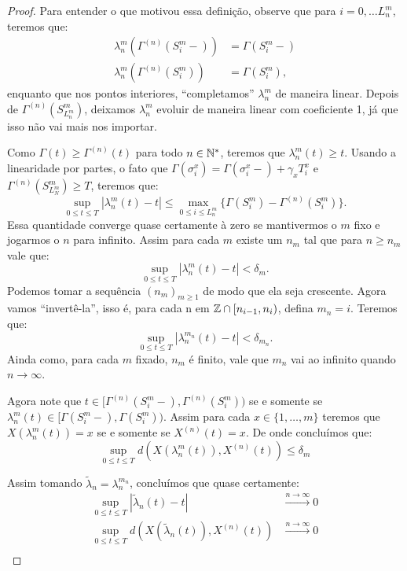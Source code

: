 \begin{proof}
  Para entender o que motivou essa definição, observe que para $i = 0,
  \ldots L_n^m$, teremos que:
  \begin{align*}
    \lambda_n^m(\Gamma^{(n)}(S_i^m-)) &= \Gamma(S_i^m-)\\
    \lambda_n^m(\Gamma^{(n)}(S_i^m)) &= \Gamma(S_i^m),
  \end{align*}
  enquanto que nos pontos interiores, ``completamos'' $\lambda_n^m$ de
  maneira linear. Depois de $\Gamma^{(n)}(S^m_{L_n^m})$, deixamos
  $\lambda_n^m$ evoluir de maneira linear com coeficiente 1, já que
  isso não vai mais nos importar.

  Como $\Gamma(t) \geq \Gamma^{(n)}(t)$ para todo $n \in {\mathbb{N^*}}$, teremos
  que $\lambda_n^m(t) \geq t$. Usando a linearidade por partes, o fato que
  $\Gamma(\sigma^x_i) = \Gamma(\sigma_i^x-) + \gamma_x T^x_i$ e
  $\Gamma^{(n)}(S^m_{L_N^m}) \geq T$, teremos que:
  \begin{displaymath}
    \sup_{0 \leq t \leq T} |\lambda_n^m(t) - t| \leq
    \max_{0 \leq i \leq L_n^m} \{ \Gamma(S_i^m) -
    \Gamma^{(n)}(S_i^m)\}.
  \end{displaymath}
  Essa quantidade converge quase certamente à zero se mantivermos o
  $m$ fixo e jogarmos o $n$ para infinito. Assim para cada $m$ existe
  um $n_m$ tal que para $n \geq n_m$ vale que:
  \begin{displaymath}
    \sup_{0 \leq t \leq T} |\lambda_n^m(t) - t| < \delta_m.
  \end{displaymath}
  Podemos tomar a sequência $(n_m)_{m \geq 1}$ de modo que ela seja
  crescente. Agora vamos ``invertê-la'', isso é, para cada n em ${\mathbb{Z}}
  \cap [n_{i-1}, n_i)$, defina $m_n = i$. Teremos que:
  \begin{displaymath}
    \sup_{0 \leq t \leq T} |\lambda_n^{m_n}(t) - t| < \delta_{m_n}.
  \end{displaymath}
  Ainda como, para cada $m$ fixado, $n_m$ é finito, vale que $m_n$ vai
  ao infinito quando $n \to \infty$.
  
  Agora note que $t \in [\Gamma^{(n)}(S_{i}^m-),
  \Gamma^{(n)}(S_{i}^m))$ se e somente se $\lambda_n^m(t) \in
  [\Gamma(S_{i}^m-), \Gamma(S_{i}^m))$. Assim para cada $x \in \{1,
  \ldots, m\}$ teremos que $X(\lambda_n^m(t)) = x$ se e somente se
  $X^{(n)}(t) = x$. De onde concluímos que:
  \begin{displaymath}
    \sup_{0 \leq t \leq T} d\left(X(\lambda_n^m(t)), X^{(n)} (t)\right)
    \leq \delta_m
  \end{displaymath}

  Assim tomando $\tilde{\lambda}_n = \lambda_n^{m_n}$, concluímos que
  quase certamente:
  \begin{align*}
    \sup_{0 \leq t \leq T} |\tilde{\lambda}_n(t) - t|
    &\xrightarrow{n\to\infty} 0 \\
    \sup_{0 \leq t \leq T} d(X(\tilde{\lambda}_n(t)), X^{(n)}(t))
    &\xrightarrow{n\to\infty} 0 \\
  \end{align*}
\end{proof}

